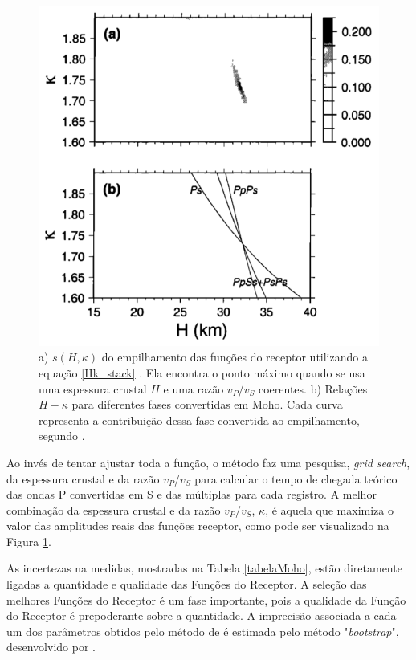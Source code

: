 \begin{figure}[!ht]
\centering
\includegraphics[scale=0.5]{Figs/grid_search.png}
\caption[a) $s(H,\kappa)$ do empilhamento das funções do receptor utilizando a equação \ref{Hk_stack}.b) Relações $H-\kappa$ para diferentes fases convertidas em Moho.]{a) $s(H,\kappa)$ do empilhamento das funções do receptor utilizando a equação \ref{Hk_stack} . Ela encontra o ponto máximo quando se usa uma espessura crustal $H$ e uma razão $v_{P}$/$v_{S}$ coerentes. b) Relações $H-\kappa$ para diferentes fases convertidas em Moho. Cada curva representa a contribuição dessa fase convertida ao empilhamento, segundo \cite{Zhu_Kanamori_2000}.}
\label{grid_search}
\end{figure}

Ao invés de tentar ajustar toda a função, o método faz uma pesquisa, \textit{grid search}, da espessura crustal e da razão $v_{P}$/$v_{S}$ para calcular o tempo de chegada teórico das ondas P convertidas em S e das múltiplas para cada registro. A melhor combinação da espessura crustal e da razão $v_{P}$/$v_{S}$, $\kappa$, é aquela que maximiza o valor das amplitudes reais das funções receptor, como pode ser visualizado na Figura \ref{grid_search}.

As incertezas na medidas, mostradas na Tabela \ref{tabelaMoho}, estão diretamente ligadas a quantidade e qualidade das Funções do Receptor. A seleção das melhores Funções do Receptor é um fase importante, pois a qualidade da Função do Receptor é prepoderante sobre a quantidade. A imprecisão associada a cada um dos parâmetros obtidos pelo método de \cite{Zhu_Kanamori_2000} é estimada pelo método "\textit{bootstrap}", desenvolvido por \cite{efron_statistical_1991}.

